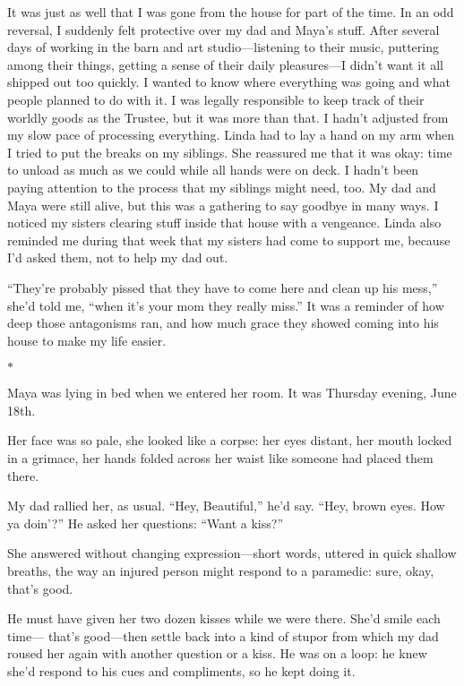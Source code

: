 \documentclass[12pt]{book}
\begin{document}
It was just as well that I was gone from the house for part of the time. In an odd reversal, I suddenly felt protective over my dad and Maya's stuff. After several days of working in the barn and art studio---listening to their music, puttering among their things, getting a sense of their daily pleasures---I didn't want it all shipped out too quickly. I wanted to know where everything was going and what people planned to do with it. I was legally responsible to keep track of their worldly goods as the Trustee, but it was more than that. I hadn't adjusted from my slow pace of processing everything. Linda had to lay a hand on my arm when I tried to put the breaks on my siblings. She reassured me that it was okay: time to unload as much as we could while all hands were on deck. I hadn't been paying attention to the process that my siblings might need, too. My dad and Maya were still alive, but this was a gathering to say goodbye in many ways. I noticed my sisters clearing stuff inside that house with a vengeance. Linda also reminded me during that week that my sisters had come to support me, because I'd asked them, not to help my dad out.

``They're probably pissed that they have to come here and clean up his mess,'' she'd told me, ``when it's your mom they really miss.'' It was a reminder of how deep those antagonisms ran, and how much grace they showed coming into his house to make my life easier.

\begin{center}$*$\end{center}

Maya was lying in bed when we entered her room. It was Thursday evening, June 18th.

Her face was so pale, she looked like a corpse: her eyes distant, her mouth locked in a grimace, her hands folded across her waist like someone had placed them there.

My dad rallied her, as usual. ``Hey, Beautiful,'' he'd say. ``Hey, brown eyes. How ya doin'?'' He asked her questions: ``Want a kiss?''

She answered without changing expression---short words, uttered in quick shallow breaths, the way an injured person might respond to a paramedic: sure, okay, that's good.

He must have given her two dozen kisses while we were there. She'd smile each time--- that's good---then settle back into a kind of stupor from which my dad roused her again with another question or a kiss. He was on a loop: he knew she'd respond to his cues and compliments, so he kept doing it.
\end{document}
